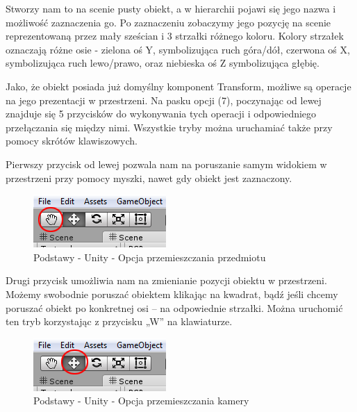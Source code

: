 \documentclass[brudnopis]{xmgr}
\begin{document}
Stworzy nam to na scenie pusty obiekt, a w hierarchii pojawi się jego nazwa i możliwość zaznaczenia go. Po zaznaczeniu zobaczymy jego pozycję na scenie reprezentowaną przez mały sześcian i 3 strzałki różnego koloru. Kolory strzałek oznaczają różne osie - zielona oś Y, symbolizująca ruch góra/dół, czerwona oś X, symbolizująca ruch lewo/prawo, oraz niebieska oś Z symbolizująca głębię. 

Jako, że obiekt posiada już domyślny komponent Transform, możliwe są operacje na jego prezentacji w przestrzeni. Na pasku opcji (7), poczynając od lewej znajduje się 5 przycisków do wykonywania tych operacji i odpowiedniego przełączania się między nimi. Wszystkie tryby można uruchamiać także  przy pomocy skrótów klawiszowych.

Pierwszy przycisk od lewej pozwala nam na poruszanie samym widokiem w przestrzeni przy pomocy myszki, nawet gdy obiekt jest zaznaczony. 

\begin{figure}[!htb]
    \begin{center}
    \includegraphics[scale=0.4]{Screeny/rodzial5screeny/drag_option}
    \end{center}
    \caption{Podstawy - Unity - Opcja przemieszczania przedmiotu}
\end{figure}

Drugi przycisk umożliwia nam na zmienianie pozycji obiektu w przestrzeni. Możemy swobodnie poruszać obiektem klikając na kwadrat, bądź jeśli chcemy poruszać obiekt po konkretnej osi – na odpowiednie strzałki. Można uruchomić ten tryb korzystając z przycisku „W” na klawiaturze.

\begin{figure}[!htb]
    \begin{center}
    \includegraphics[scale=0.4]{Screeny/rodzial5screeny/move_option}
    \end{center}
    \caption{Podstawy - Unity - Opcja przemieszczania kamery}
\end{figure}
\end{document}
